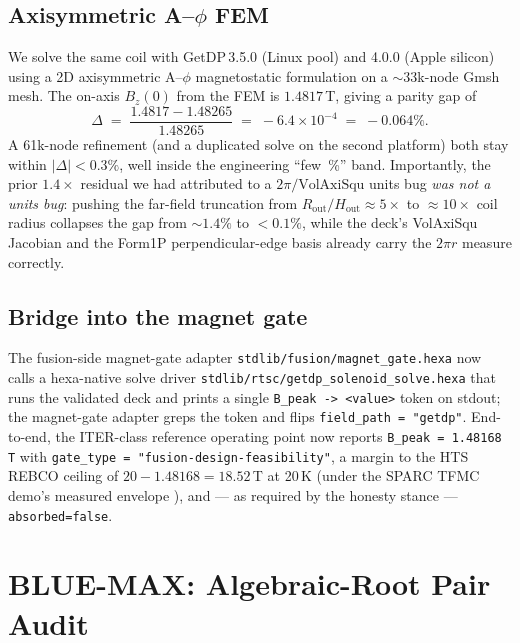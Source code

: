 \documentclass[11pt,a4paper]{article}
\begin{document}
\subsection{Axisymmetric A--$\phi$ FEM}

We solve the same coil with GetDP\,3.5.0 (Linux pool) and 4.0.0
(Apple silicon) using a 2D axisymmetric A--$\phi$ magnetostatic
formulation on a $\sim$33k-node Gmsh mesh. The on-axis $B_z(0)$ from
the FEM is $1.4817$\,T, giving a parity gap of
\begin{equation}
\Delta \;=\; \frac{1.4817 - 1.48265}{1.48265} \;=\; -6.4\!\times\!10^{-4}
\;=\; -0.064\%.
\end{equation}
A 61k-node refinement (and a duplicated solve on the second
platform) both stay within $|\Delta|<0.3\%$, well inside the
engineering ``few~\%'' band. Importantly, the prior $1.4\times$
residual we had attributed to a $2\pi/\text{VolAxiSqu}$ units bug
\emph{was not a units bug}: pushing the far-field truncation from
$R_{\text{out}}/H_{\text{out}}\approx 5\!\times\!$ to
$\approx 10\!\times\!$ coil radius collapses the gap from $\sim 1.4\%$ to
$<\!0.1\%$, while the deck's VolAxiSqu Jacobian and the Form1P
perpendicular-edge basis already carry the $2\pi r$ measure
correctly.

\subsection{Bridge into the magnet gate}

The fusion-side magnet-gate adapter
\verb|stdlib/fusion/magnet_gate.hexa| now calls a hexa-native solve
driver \verb|stdlib/rtsc/getdp_solenoid_solve.hexa| that runs the
validated deck and prints a single \verb|B_peak -> <value>| token on
stdout; the magnet-gate adapter greps the token and flips
\texttt{field\_path = "getdp"}. End-to-end, the ITER-class reference
operating point now reports \verb|B_peak = 1.48168 T| with
\verb|gate_type = "fusion-design-feasibility"|, a margin to the HTS
REBCO ceiling of $20 - 1.48168 = 18.52$\,T at 20\,K (under the SPARC
TFMC demo's measured envelope \citep{hartwig2024sparcmagnet}), and
--- as required by the honesty stance --- \texttt{absorbed=false}.

\section{BLUE-MAX: Algebraic-Root Pair Audit}
\label{sec:bluemax}
\end{document}
